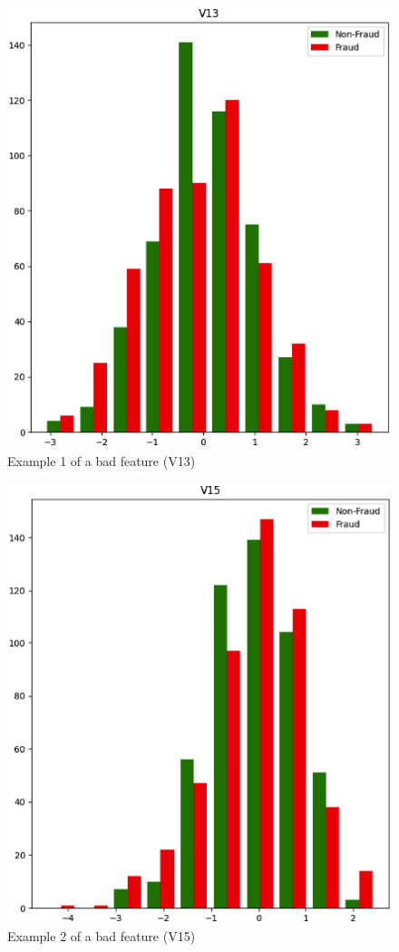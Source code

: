 \documentclass[conference]{IEEEtran}
\begin{document}
\begin{figure}[H]
    \centering
    \includegraphics[width=1\linewidth]{images/feature13histogram.png}
    \caption{Example 1 of a bad feature (V13)}
    \label{fig:enter-label}
\end{figure}

\begin{figure}[H]
    \centering
    \includegraphics[width=1\linewidth]{images/feature15histogram.png}
    \caption{Example 2 of a bad feature (V15)}
    \label{fig:enter-label}
\end{figure}
\end{document}
